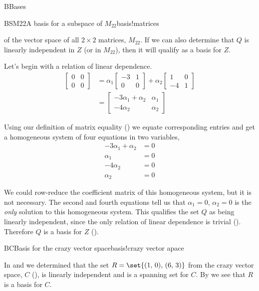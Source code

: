 \begin{subsect}{B}{Bases}
\begin{example}{BSM22}{A basis for a subspace of $M_{22}$}{basis!matrices}
\begin{para}
\begin{equation*}
\end{equation*}
%
of the vector space of all $2\times 2$ matrices, $M_{22}$.  If we can also determine that $Q$ is linearly independent in $Z$ (or in $M_{22}$), then it will qualify as a basis for $Z$.\end{para}
%
\begin{para}Let's begin with a relation of linear dependence.
%
\begin{align*}
\begin{bmatrix}0&0\\0&0\end{bmatrix}
&=
\alpha_1\begin{bmatrix}-3&1\\0&0\end{bmatrix}+
\alpha_2\begin{bmatrix}1&0\\-4&1\end{bmatrix}\\
&=\begin{bmatrix}
-3\alpha_1 +\alpha_2  & \alpha_1\\
-4\alpha_2 & \alpha_2
\end{bmatrix}
\end{align*}
\end{para}
%
\begin{para}Using our definition of matrix equality () we equate corresponding entries and get a homogeneous system of four equations in two variables,
%
\begin{align*}
-3\alpha_1 +\alpha_2&=0\\
\alpha_1&=0\\
-4\alpha_2&=0\\
\alpha_2&=0
\end{align*}
\end{para}
%
\begin{para}We could row-reduce the coefficient matrix of this homogeneous system, but it is not necessary.  The second and fourth equations tell us that $\alpha_1=0$, $\alpha_2=0$ is the {\em only} solution to this homogeneous system.  This qualifies the set $Q$ as being linearly independent, since the only relation of linear dependence is trivial ().  Therefore $Q$ is a basis for $Z$ ().\end{para}
%
\end{example}
%
\begin{example}{BC}{Basis for the crazy vector space}{basis!crazy vector apace}
\begin{para}In  and  we determined that the set $R=\set{(1,\,0),\,(6,\,3)}$ from the crazy vector space, $C$ (), is linearly independent and is a spanning set for $C$.  By  we see that $R$ is a basis for $C$.\end{para}

\end{example}
\end{subsect}
